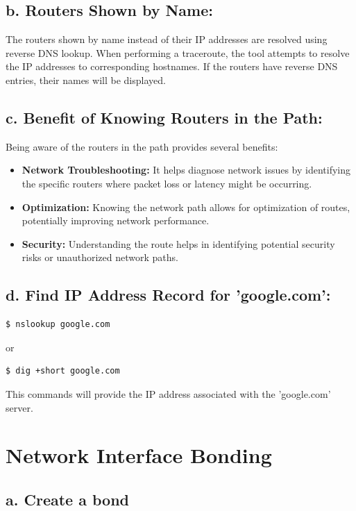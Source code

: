 \documentclass{report}
\begin{document}
\subsection*{b. Routers Shown by Name:}
The routers shown by name instead of their IP addresses are resolved using reverse DNS lookup. When performing a traceroute, the tool attempts to resolve the IP addresses to corresponding hostnames. If the routers have reverse DNS entries, their names will be displayed.

\subsection*{c. Benefit of Knowing Routers in the Path:}
Being aware of the routers in the path provides several benefits:
\begin{itemize}
  \item \textbf{Network Troubleshooting:} It helps diagnose network issues by identifying the specific routers where packet loss or latency might be occurring.
  \item \textbf{Optimization:} Knowing the network path allows for optimization of routes, potentially improving network performance.
  \item \textbf{Security:} Understanding the route helps in identifying potential security risks or unauthorized network paths.
\end{itemize}

\subsection*{d. Find IP Address Record for 'google.com':}

\begin{lstlisting}[language=bash]
  $ nslookup google.com
\end{lstlisting}

or
\begin{lstlisting}[language=bash]
  $ dig +short google.com
\end{lstlisting}

This commands will provide the IP address associated with the 'google.com' server.


\section*{Network Interface Bonding}

\subsection*{a. Create a bond}
\end{document}
